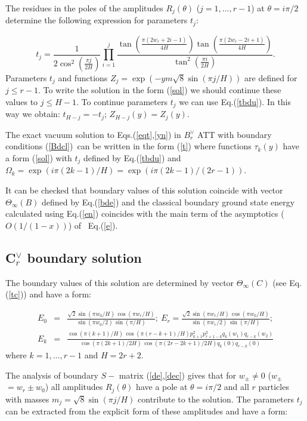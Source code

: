 \documentclass[a4paper,12pt,titlepage,final]{article}
\begin{document}
The residues in the poles of the amplitudes $R_{j}(\theta )$ ($j=1,...,r-1$)
at $\theta =i\pi /2$ determine the following expression for parameters
$t_{j} $:

\begin{equation}
t_{j}=\frac{1}{2\cos ^{2}(\frac{\pi j}{2H})}\prod_{i=1}^{j}
\frac{\tan (\frac{\pi (2w_{r}+2i-1)}{4H})
\tan (\frac{\pi (2w_{r}-2i+1)}{4H})}
{\tan ^{2}\left(
\frac{\pi i}{2H}\right) }.  \label{tbdu}
\end{equation}
Parameters $t_{j}$ and functions $Z_{j}=\exp (-ym\sqrt{8}\sin (\pi j/H))$
are defined for $j\leq r-1$. To write the solution in the form (\ref{sol})
we should continue these values to $j\leq H-1$. To continue parameters
$t_{j} $ we can use Eq.(\ref{tbdu}). In this way we obtain:
$t_{H-j}=-t_{j}$; $Z_{H-j}(y)=Z_{j}(y)$.

The exact vacuum solution to Eqs.(\ref{eqt},\ref{yn}) in $B_{r}^{\vee }$ ATT
with boundary conditions (\ref{Bdcl})\ can be written in the form (\ref{t})
where functions $\tau _{k}(y)$ have a form (\ref{sol}) with $t_{j}$ defined
by Eq.(\ref{tbdu}) and $\Omega _{k}=\exp (i\pi (2k-1)/H)=\exp (i\pi
(2k-1)/(2r-1))$.

It can be checked that boundary values of this solution coincide with
vector
$\Theta _{\infty }(B)$ defined by Eq.(\ref{bde}) and the classical boundary
ground state energy calculated using Eq.(\ref{en}) coincides with the main
term of the asymptotics ($O(1/(1-x))$) of \ Eq.(\ref{e}).

\subsection{C$_{r}^{\vee }$ boundary solution}

The boundary values of this solution are determined by vector $\Theta
_{\infty }(C)$ (see Eq.(\ref{tc})) and have a form:

\begin{eqnarray}
E_{0} &=&\frac{\sqrt{2}\sin (\pi w_{0}/H)\,\cos (\pi w_{r}/H)}
{\sin (\pi w_{0}/2)\,\sin (\pi /H)};~E_{r}=
\frac{\sqrt{2}\sin (\pi w_{r}/H)\,\cos (\pi w_{0}/H)}
{\sin (\pi w_{r}/2)\,\sin (\pi /H)};  \nonumber \\
E_{k} &=&\frac{\cos (\pi (k+1)/H)\,\cos (\pi
(r-k+1)/H)p_{k+1}^{2}p_{r+1-k}^{2}q_{k}(w_{1})q_{r-k}(w_{2})}
{\cos (\pi(2k+1)/2H)
\,\cos (\pi (2r-2k+1)/2H)q_{k}(0)q_{r-k}(0)}  \label{3}
\end{eqnarray}
where $k=1,...,r-1$ and $H=2r+2$.

The analysis of boundary $S-$ matrix (\ref{de},\ref{dec}) gives that for
$w_{\pm }\neq 0$ ($w_{\pm }$ $=w_{r}\pm w_{0}$)
all amplitudes $R_{j}(\theta) $
have a pole at $\theta =i\pi /2$ and all $r$ particles with masses
$m_{j}=\sqrt{8}\sin (\pi j/H)$ contribute to the solution. The parameters
$t_{j}$ can be extracted from the explicit form of
these amplitudes and have a form:
\end{document}
